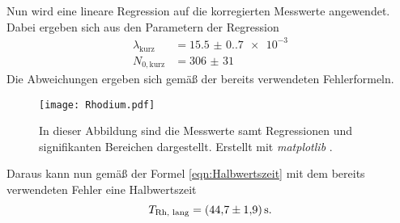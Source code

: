 Nun wird eine lineare Regression auf die korregierten Messwerte angewendet. Dabei ergeben sich aus den Parametern der Regression 
\begin{align*}
  \lambda_\text{kurz} &= \num{15.5(0.7)e-3} \\
  N_{0, \text{kurz}} &= \num{306(31)} 
\end{align*}
Die Abweichungen ergeben sich gemäß der bereits verwendeten Fehlerformeln.
\begin{figure}
  \centering
  \texttt{[image: Rhodium.pdf]}
  \caption{In dieser Abbildung sind die Messwerte samt Regressionen und signifikanten Bereichen dargestellt. Erstellt mit \textit{matplotlib} \cite{matplotlib}.}
  \label{fig:Rhodium}
\end{figure}

Daraus kann nun gemäß der Formel \eqref{eqn:Halbwertszeit} mit dem bereits verwendeten Fehler eine Halbwertszeit 
\begin{equation*}
  T_\text{Rh, lang} = \qty{44.7+-1.9}{\second}.
\end{equation*}